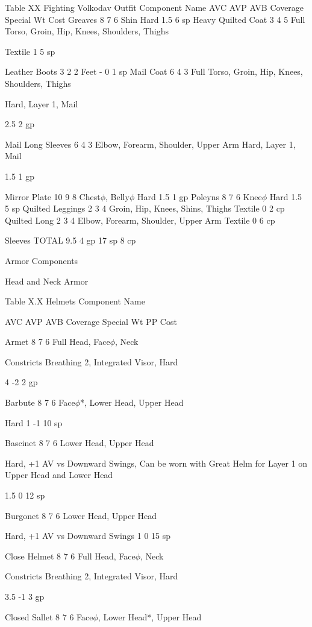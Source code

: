 \documentclass[oneside,11pt,english]{book}
\begin{document}
 
Table XX Fighting Volkodav Outfit 
Component Name AVC AVP AVB Coverage Special Wt Cost 
Greaves 8 7 6 Shin Hard 1.5 6 sp 
Heavy Quilted Coat 3 4 5 Full Torso, Groin, Hip, Knees, Shoulders, 
Thighs 

Textile 1 5 sp 

Leather Boots 3 2 2 Feet - 0 1 sp 
Mail Coat 6 4 3 Full Torso, Groin, Hip, Knees, Shoulders, 
Thighs 

Hard, Layer 1, 
Mail 

2.5 2 gp 

Mail Long Sleeves 6 4 3 Elbow, Forearm, Shoulder, Upper Arm Hard, Layer 1, 
Mail 

1.5 1 gp 

Mirror Plate 10 9 8 Chest$\phi$, Belly$\phi$ Hard 1.5 1 gp 
Poleyns 8 7 6 Knee$\phi$ Hard 1.5 5 sp 
Quilted Leggings 2 3 4 Groin, Hip, Knees, Shins, Thighs Textile 0 2 cp 
Quilted Long 2 3 4 Elbow, Forearm, Shoulder, Upper Arm Textile 0 6 cp 


Sleeves 
TOTAL 9.5 4 gp 
17 
sp 
8 cp 

 

Armor Components 

 

Head and Neck Armor 

 

Table X.X Helmets 
Component 
Name 

AVC AVP AVB Coverage Special Wt PP Cost 

Armet 8 7 6 Full Head, Face$\phi$, 
Neck 

Constricts Breathing 2, 
Integrated Visor, Hard 

4 -2 2 gp 

Barbute 8 7 6 Face$\phi$*, Lower Head, 
Upper Head 

Hard 1 -1 10 
sp 

Bascinet 8 7 6 Lower Head, Upper 
Head 

Hard, +1 AV vs Downward Swings, 
Can be worn with Great Helm for 
Layer 1 on Upper Head and Lower 
Head 

1.5 0 12 
sp 

Burgonet 8 7 6 Lower Head, Upper 
Head 

Hard, +1 AV vs Downward Swings 1 0 15 
sp 

Close Helmet 8 7 6 Full Head, Face$\phi$, 
Neck 

Constricts Breathing 2, 
Integrated Visor, Hard 

3.5 -1 3 gp 

Closed Sallet 8 7 6 Face$\phi$, Lower Head*, 
Upper Head 
\end{document}
